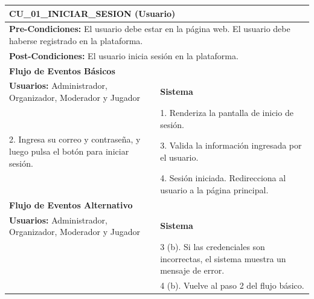%
%

\begin{center}
  \begin{tabular}{| p{7.5cm} | p{7.5cm} |}
    \hline
    \multicolumn{2}{|p{15cm}|}{\textbf{CU\_01\_INICIAR\_SESION} (Usuario)} \\ \hline
    \multicolumn{2}{|p{15cm}|}{\textbf{Pre-Condiciones:} El usuario debe estar en la página web. El usuario debe haberse registrado en la plataforma.} \\ \hline
    \multicolumn{2}{|p{15cm}|}{\textbf{Post-Condiciones:} El usuario inicia sesión en la plataforma.} \\ \hline
    \multicolumn{2}{|p{7.5cm}|}{\textbf{Flujo de Eventos Básicos}} \\ \hline
    \multicolumn{1}{|p{7.5cm}|}{\textbf{Usuarios:} Administrador, Organizador, Moderador y Jugador} & \multicolumn{1}{|p{7.5cm}|}{\textbf{Sistema}} \\ \hline
    
    \multicolumn{1}{|p{7.5cm}|}{} & 
    \multicolumn{1}{|p{7.5cm}|}{1. Renderiza la pantalla de inicio de sesión.}\\ \hline
    
    \multicolumn{1}{|p{7.5cm}|}{2. Ingresa su correo y contraseña, y luego pulsa el botón para iniciar sesión.}& 
    \multicolumn{1}{|p{7.5cm}|}{3. Valida la información ingresada por el usuario.}\\ \hline
    
    \multicolumn{1}{|p{7.5cm}|}{} & 
    \multicolumn{1}{|p{7.5cm}|}{4. Sesión iniciada. Redirecciona al usuario a la página principal.}\\ \hline
    
    \multicolumn{2}{|p{7.5cm}|}{\textbf{Flujo de Eventos Alternativo}} \\ \hline
    
    \multicolumn{1}{|p{7.5cm}|}{\textbf{Usuarios:} Administrador, Organizador, Moderador y Jugador} & \multicolumn{1}{|p{7.5cm}|}{\textbf{Sistema}} \\ \hline
    
    \multicolumn{1}{|p{7.5cm}|}{} & 
    \multicolumn{1}{|p{7.5cm}|}{3 (b). Si las credenciales son incorrectas, el sistema muestra un mensaje de error.}\\ \hline
    
    \multicolumn{1}{|p{7.5cm}|}{} & 
    \multicolumn{1}{|p{7.5cm}|}{4 (b). Vuelve al paso 2 del flujo básico.}\\ \hline
  \end{tabular}
\end{center}

